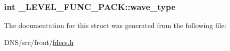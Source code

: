 \subsubsection[{\texorpdfstring{wave\+\_\+type}{wave_type}}]{\setlength{\rightskip}{0pt plus 5cm}int \+\_\+\+L\+E\+V\+E\+L\+\_\+\+F\+U\+N\+C\+\_\+\+P\+A\+C\+K\+::wave\+\_\+type}\hypertarget{struct___l_e_v_e_l___f_u_n_c___p_a_c_k_a114b44d4518e385aa2b11da5ac67931a}{}\label{struct___l_e_v_e_l___f_u_n_c___p_a_c_k_a114b44d4518e385aa2b11da5ac67931a}


The documentation for this struct was generated from the following file\+:\begin{DoxyCompactItemize}
\item 
D\+N\+S/src/front/\hyperlink{fdecs_8h}{fdecs.\+h}\end{DoxyCompactItemize}
